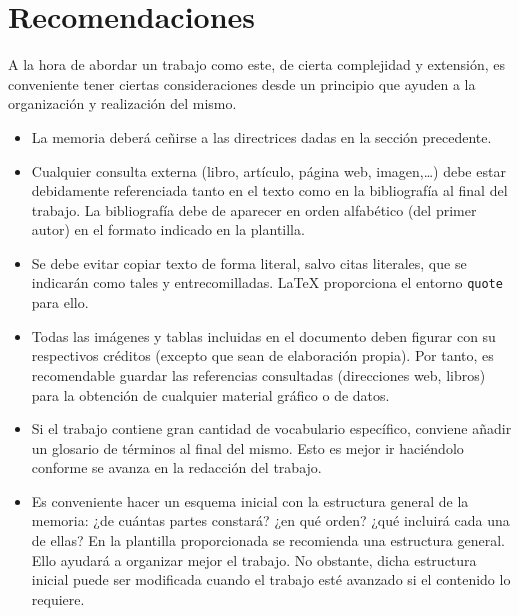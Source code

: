 \section{Recomendaciones}
A la hora de abordar un trabajo como este, de cierta complejidad y extensión, es conveniente tener ciertas consideraciones desde un principio que ayuden a la organización y realización del mismo.
\begin{itemize}
    \item La memoria deberá ceñirse a las directrices dadas en la sección precedente. 
    
    \item Cualquier consulta externa (libro, artículo, página web, imagen,\ldots) debe estar debidamente referenciada tanto en el texto como en la bibliografía al final del trabajo. La bibliografía debe de aparecer en orden alfabético (del primer autor) en el formato indicado en la plantilla. 

    \item Se debe evitar copiar texto de forma literal, salvo citas literales, que se indicarán como tales y entrecomilladas. LaTeX proporciona el entorno \texttt{quote} para ello.

    \item Todas las imágenes y tablas incluidas en el documento deben figurar con su respectivos créditos (excepto que sean de elaboración propia). Por tanto, es recomendable guardar las referencias consultadas (direcciones web, libros) para la obtención de cualquier material gráfico o de datos.

    \item Si el trabajo contiene gran cantidad de vocabulario específico, conviene añadir un glosario de términos al final del mismo. Esto es mejor ir haciéndolo conforme se avanza en la redacción del trabajo.

    \item Es conveniente hacer un esquema inicial con la estructura general de la memoria: ¿de cuántas partes constará? ¿en qué orden? ¿qué incluirá cada una de ellas? En la plantilla proporcionada se recomienda una estructura general. Ello ayudará a organizar mejor el trabajo. No obstante, dicha estructura inicial puede ser modificada cuando el trabajo esté avanzado si el contenido lo requiere.
\end{itemize}
